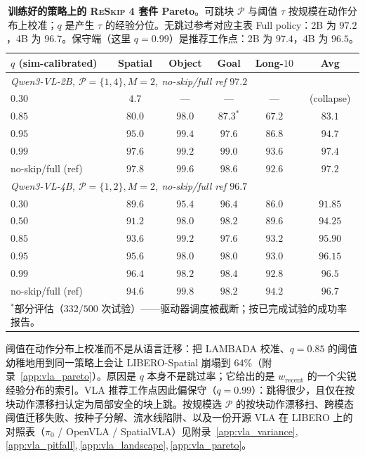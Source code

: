 \documentclass{article}
\newcommand{\reskip}{\textsc{ReSkip}}
\begin{document}
\begin{table}[t]
\caption{\textbf{训练好的策略上的 \reskip{} 4 套件 Pareto}。可跳块 $\mathcal{P}$ 与阈值 $\tau$ 按规模在动作分布上校准；$q$ 是产生 $\tau$ 的经验分位。无跳过参考对应主表 Full policy：2B 为 $97.2$，4B 为 $96.7$。保守端（这里 $q{=}0.99$）是推荐工作点：2B 为 $97.4$，4B 为 $96.5$。}
\label{tab:vla_reskip_pareto}
\centering\small
\setlength{\tabcolsep}{4pt}
\begin{tabular}{lccccc}
\toprule
$q$ (sim-calibrated) & Spatial & Object & Goal & Long-$10$ & \textbf{Avg} \\
\midrule
\multicolumn{6}{l}{\emph{Qwen3-VL-2B, $\mathcal{P}{=}\{1,4\}, M{=}2$, no-skip/full ref $97.2$}} \\
\midrule
$0.30$              & $4.7$  & ---     & ---     & ---     & (collapse) \\
$0.85$              & $80.0$ & $98.0$  & $87.3^\ast$ & $67.2$  & $83.1$ \\
$0.95$              & $95.0$ & $99.4$  & $97.6$  & $86.8$  & $94.7$ \\
$\mathbf{0.99}$     & $\mathbf{97.6}$ & $\mathbf{99.2}$  & $\mathbf{99.0}$  & $\mathbf{93.6}$  & $\mathbf{97.4}$ \\
no-skip/full (ref)  & $97.8$ & $99.6$  & $98.6$  & $92.6$  & $97.2$ \\
\midrule
\multicolumn{6}{l}{\emph{Qwen3-VL-4B, $\mathcal{P}{=}\{1,2\}, M{=}2$, no-skip/full ref $96.7$}} \\
\midrule
$0.30$              & $89.6$ & $95.4$  & $96.4$  & $86.0$  & $91.85$ \\
$0.50$              & $91.2$ & $98.0$  & $98.2$  & $89.6$  & $94.25$ \\
$0.85$              & $93.6$ & $99.2$  & $97.6$  & $93.2$  & $95.90$ \\
$0.95$              & $95.6$ & $98.0$  & $98.0$  & $93.0$  & $96.15$ \\
$\mathbf{0.99}$     & $\mathbf{96.4}$ & $\mathbf{98.2}$  & $\mathbf{98.4}$  & $\mathbf{92.8}$  & $\mathbf{96.5}$ \\
no-skip/full (ref)  & $94.6$ & $99.8$  & $98.2$  & $94.2$  & $96.7$ \\
\bottomrule
\multicolumn{6}{p{14cm}}{\footnotesize $^\ast$部分评估（$332/500$ 次试验）——驱动器调度被截断；按已完成试验的成功率报告。}
\end{tabular}
\end{table}

阈值在动作分布上校准而不是从语言迁移：把 LAMBADA 校准、$q{=}0.85$ 的阈值幼稚地用到同一策略上会让 LIBERO-Spatial 崩塌到 $64\%$（附录~\ref{app:vla_pareto}）。原因是 $q$ 本身不是跳过率；它给出的是 $w_{\text{recent}}$ 的一个尖锐经验分布的索引。VLA 推荐工作点因此偏保守（$q{=}0.99$）：跳得很少，且仅在按块动作漂移扫认定为局部安全的块上跳。按规模选 $\mathcal{P}$ 的按块动作漂移扫、跨模态阈值迁移失败、按种子分解、流水线陷阱、以及一份开源 VLA 在 LIBERO 上的对照表（$\pi_0$ / OpenVLA / SpatialVLA）见附录~\ref{app:vla_variance},\,\ref{app:vla_pitfall},\,\ref{app:vla_landscape},\,\ref{app:vla_pareto}。
\end{document}
